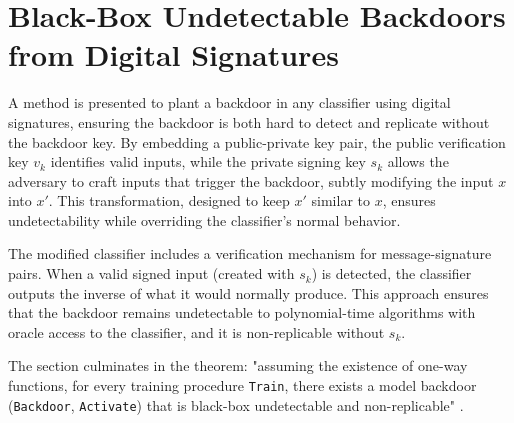 \documentclass[
	fontsize=12pt,
	headings=small,
	parskip=quarter,
	bibliography=totoc,
	numbers=noenddot,       
	open=any,               
 	final                   
]{scrreprt}
\begin{document}
\section{Black-Box Undetectable Backdoors from Digital Signatures}

A method is presented to plant a backdoor in any classifier using digital signatures, ensuring the backdoor is both hard to detect and replicate without the backdoor key. By embedding a public-private key pair, the public verification key $v_k$ identifies valid inputs, while the private signing key $s_k$ allows the adversary to craft inputs that trigger the backdoor, subtly modifying the input $x$ into $x'$. This transformation, designed to keep $x'$ similar to $x$, ensures undetectability while overriding the classifier’s normal behavior.
\par The modified classifier includes a verification mechanism for message-signature pairs. When a valid signed input (created with $s_k$) is detected, the classifier outputs the inverse of what it would normally produce. This approach ensures that the backdoor remains undetectable to polynomial-time algorithms with oracle access to the classifier, and it is non-replicable without $s_k$.
\par The section culminates in the theorem: "assuming the existence of one-way functions, for every training procedure \texttt{Train}, there exists a model backdoor (\texttt{Backdoor}, \texttt{Activate}) that is black-box undetectable and non-replicable" \cite{goldwasser2022backdoors}.
\end{document}
